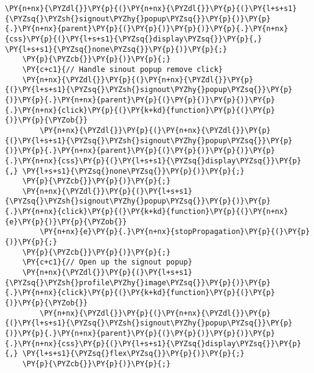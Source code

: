 \begin{Verbatim}[commandchars=\\\{\}]
        \PY{n+nx}{\PYZdl{}}\PY{p}{(}\PY{n+nx}{\PYZdl{}}\PY{p}{(}\PY{l+s+s1}{\PYZsq{}\PYZsh{}signout\PYZhy{}popup\PYZsq{}}\PY{p}{)}\PY{p}{.}\PY{n+nx}{parent}\PY{p}{(}\PY{p}{)}\PY{p}{)}\PY{p}{.}\PY{n+nx}{css}\PY{p}{(}\PY{l+s+s1}{\PYZsq{}display\PYZsq{}}\PY{p}{,} \PY{l+s+s1}{\PYZsq{}none\PYZsq{}}\PY{p}{)}\PY{p}{;}
    \PY{p}{\PYZcb{}}\PY{p}{)}\PY{p}{;}
    \PY{c+c1}{// Handle sinout popup remove click}
    \PY{n+nx}{\PYZdl{}}\PY{p}{(}\PY{n+nx}{\PYZdl{}}\PY{p}{(}\PY{l+s+s1}{\PYZsq{}\PYZsh{}signout\PYZhy{}popup\PYZsq{}}\PY{p}{)}\PY{p}{.}\PY{n+nx}{parent}\PY{p}{(}\PY{p}{)}\PY{p}{)}\PY{p}{.}\PY{n+nx}{click}\PY{p}{(}\PY{k+kd}{function}\PY{p}{(}\PY{p}{)}\PY{p}{\PYZob{}}
        \PY{n+nx}{\PYZdl{}}\PY{p}{(}\PY{n+nx}{\PYZdl{}}\PY{p}{(}\PY{l+s+s1}{\PYZsq{}\PYZsh{}signout\PYZhy{}popup\PYZsq{}}\PY{p}{)}\PY{p}{.}\PY{n+nx}{parent}\PY{p}{(}\PY{p}{)}\PY{p}{)}\PY{p}{.}\PY{n+nx}{css}\PY{p}{(}\PY{l+s+s1}{\PYZsq{}display\PYZsq{}}\PY{p}{,} \PY{l+s+s1}{\PYZsq{}none\PYZsq{}}\PY{p}{)}\PY{p}{;}
    \PY{p}{\PYZcb{}}\PY{p}{)}\PY{p}{;}
    \PY{n+nx}{\PYZdl{}}\PY{p}{(}\PY{l+s+s1}{\PYZsq{}\PYZsh{}signout\PYZhy{}popup\PYZsq{}}\PY{p}{)}\PY{p}{.}\PY{n+nx}{click}\PY{p}{(}\PY{k+kd}{function}\PY{p}{(}\PY{n+nx}{e}\PY{p}{)}\PY{p}{\PYZob{}}
        \PY{n+nx}{e}\PY{p}{.}\PY{n+nx}{stopPropagation}\PY{p}{(}\PY{p}{)}\PY{p}{;}
    \PY{p}{\PYZcb{}}\PY{p}{)}\PY{p}{;}
    \PY{c+c1}{// Open up the signout popup}
    \PY{n+nx}{\PYZdl{}}\PY{p}{(}\PY{l+s+s1}{\PYZsq{}\PYZsh{}profile\PYZhy{}image\PYZsq{}}\PY{p}{)}\PY{p}{.}\PY{n+nx}{click}\PY{p}{(}\PY{k+kd}{function}\PY{p}{(}\PY{p}{)}\PY{p}{\PYZob{}}
        \PY{n+nx}{\PYZdl{}}\PY{p}{(}\PY{n+nx}{\PYZdl{}}\PY{p}{(}\PY{l+s+s1}{\PYZsq{}\PYZsh{}signout\PYZhy{}popup\PYZsq{}}\PY{p}{)}\PY{p}{.}\PY{n+nx}{parent}\PY{p}{(}\PY{p}{)}\PY{p}{)}\PY{p}{.}\PY{n+nx}{css}\PY{p}{(}\PY{l+s+s1}{\PYZsq{}display\PYZsq{}}\PY{p}{,} \PY{l+s+s1}{\PYZsq{}flex\PYZsq{}}\PY{p}{)}\PY{p}{;}
    \PY{p}{\PYZcb{}}\PY{p}{)}\PY{p}{;}



\end{Verbatim}
